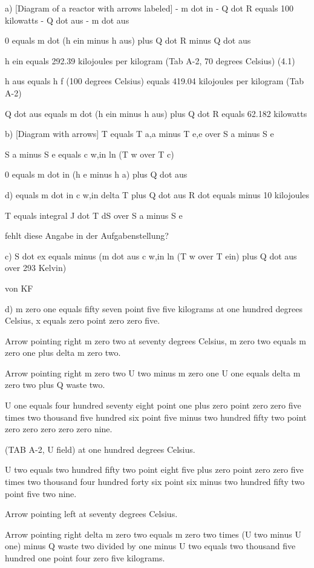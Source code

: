 a) [Diagram of a reactor with arrows labeled]
- m dot in
- Q dot R equals 100 kilowatts
- Q dot aus
- m dot aus

0 equals m dot (h ein minus h aus) plus Q dot R minus Q dot aus

h ein equals 292.39 kilojoules per kilogram (Tab A-2, 70 degrees Celsius) (4.1)

h aus equals h f (100 degrees Celsius) equals 419.04 kilojoules per kilogram (Tab A-2)

Q dot aus equals m dot (h ein minus h aus) plus Q dot R equals 62.182 kilowatts

b) [Diagram with arrows]
T equals T a,a minus T e,e over S a minus S e

S a minus S e equals c w,in ln (T w over T c)

0 equals m dot in (h e minus h a) plus Q dot aus

d) equals m dot in c w,in delta T plus Q dot aus
R dot equals minus 10 kilojoules

T equals integral J dot T dS over S a minus S e

fehlt diese Angabe in der Aufgabenstellung?

c) S dot ex equals minus (m dot aus c w,in ln (T w over T ein) plus Q dot aus over 293 Kelvin)

von KF

d) m zero one equals fifty seven point five five kilograms at one hundred degrees Celsius, x equals zero point zero zero five. 

Arrow pointing right m zero two at seventy degrees Celsius, m zero two equals m zero one plus delta m zero two.

Arrow pointing right m zero two U two minus m zero one U one equals delta m zero two plus Q waste two.

U one equals four hundred seventy eight point one plus zero point zero zero five times two thousand five hundred six point five minus two hundred fifty two point zero zero zero zero zero nine. 

(TAB A-2, U field) at one hundred degrees Celsius.

U two equals two hundred fifty two point eight five plus zero point zero zero five times two thousand four hundred forty six point six minus two hundred fifty two point five two nine. 

Arrow pointing left at seventy degrees Celsius.

Arrow pointing right delta m zero two equals m zero two times (U two minus U one) minus Q waste two divided by one minus U two equals two thousand five hundred one point four zero five kilograms.

